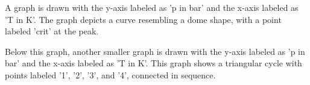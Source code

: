 A graph is drawn with the y-axis labeled as 'p in bar' and the x-axis labeled as 'T in K'. The graph depicts a curve resembling a dome shape, with a point labeled 'crit' at the peak.  

Below this graph, another smaller graph is drawn with the y-axis labeled as 'p in bar' and the x-axis labeled as 'T in K'. This graph shows a triangular cycle with points labeled '1', '2', '3', and '4', connected in sequence.